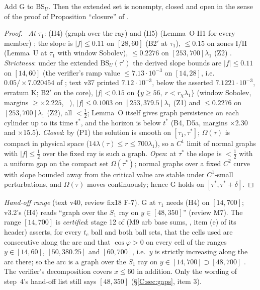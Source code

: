 \documentclass[11pt]{article}
\begin{document}
\begin{lemma}\label{C:lem:G}
Add $\mathrm{G}$ to $\mathrm{BS}_U$. Then the extended set is nonempty, closed and open in the sense of the proof of Proposition ``closure'' of .
\end{lemma}
\begin{proof}\tP\ \emph{At $\tau_1$}: (H4) (graph over the ray) and (H5) (Lemma~O H1 for every member) \tH; the slope is $|f|\le0.11$ on $[28,60]$ (B2$'$ at $\tau_1$), $\le0.15$ on zones I/II (Lemma~U at $\tau_1$ with window Sobolev), $\le0.2276$ on $[253,700]\lambda_1$ (Z2) \tC. \emph{Strictness}: under the extended $\mathrm{BS}_U(\tau')$ the derived slope bounds are $|f|\le0.11$ on $[14,60]$ (the verifier's ramp value $\le7.13\cdot10^{-3}$ on $[14,28]$, i.e.\ $0.05/\times7.020454$ of  ; text v37 printed $7.12\cdot10^{-3}$, below the asserted $7.1221\cdot10^{-3}$, erratum K; B2$'$ on the core), $|f|<0.15$ on $\{y\ge56,\ r<r_\chi\lambda_1\}$ (window Sobolev, margins $\ge\times2.225$, \SU\ ), $|f|\le0.1003$ on $[253,379.5]\lambda_1$ (Z1) and $\le0.2276$ on $[253,700]\lambda_1$ (Z2), all $<\frac12$; Lemma~O itself gives graph persistence on each cylinder up to its time $t^*$, and the horizon is below $t^*$ (B4, D5a, margins $\times2.30$ and $\times15.5$). \emph{Closed}: by (P1) the solution is smooth on $[\tau_1,\tau^*]$; $\Omega(\tau)$ is compact in physical space ($14\lambda(\tau)\le r\le700\lambda_1$), so a $C^1$ limit of normal graphs with $|f|\le\frac12$ over the fixed ray is such a graph. \emph{Open}: at $\tau^*$ the slope is $<\frac12$ with a uniform gap on the compact set $\Omega(\tau^*)$; normal graphs over a fixed $C^2$ curve with slope bounded away from the critical value are stable under $C^1$-small perturbations, and $\Omega(\tau)$ moves continuously; hence G holds on $[\tau^*,\tau^*+\delta]$.
\end{proof}
\noindent\emph{Hand-off range} (text v40, review fix18 F-7). G at $\tau_1$ needs (H4) on $[14,700]$; v3.2's (H4) reads ``graph over the $S_1$ ray on $y\in[48,350]$'' (review M7). The range $[14,700]$ is \emph{certified}: stage 12 of  (M9 arb base sums, , item (e) of its header) asserts, for every $t_c$ ball and both ball sets, that the cells used are consecutive along the arc and that $\cos\varphi>0$ on every cell of the ranges $y\in[14,60]$, $[50,380.25]$ and $[60,700]$, i.e.\ $y$ is strictly increasing along the arc there; so the arc is a graph over the $S_1$ ray on $y\in[14,700]\supset[48,700]$ \tC. The verifier's decomposition covers $x\le60$ in addition. Only the wording of step~4's hand-off list still says $[48,350]$ (\S\ref{C:sec:gaps}, item 3).
\end{document}
